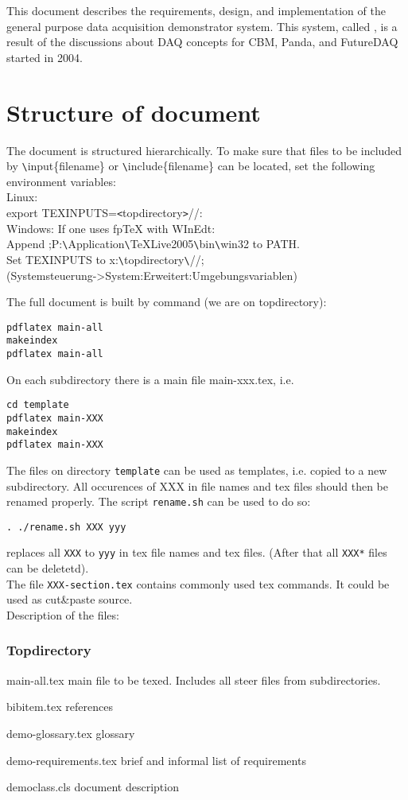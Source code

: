 
This document describes the requirements, design, and implementation of the
general purpose data acquisition demonstrator system.
This system, called {\DDA}, is a result of the discussions about DAQ concepts for CBM,
Panda, and FutureDAQ started in 2004.

\section{Structure of document}
The document is structured hierarchically. To make sure that files
to be included by \verb+\+input\{filename\} or \verb+\+include\{filename\}
can be located, set the following environment variables:\\
Linux:\\
export TEXINPUTS=\verb+<+topdirectory\verb+>+//:\\
Windows: If one uses fpTeX with WInEdt:\\
Append ;P:\verb+\+Application\verb+\+TeXLive2005\verb+\+bin\verb+\+win32 to PATH.\\
Set TEXINPUTS to x:\verb+\+topdirectory\verb+\+//;\\
(Systemsteuerung->System:Erweitert:Umgebungsvariablen)

The full document is built by command (we are on topdirectory):
\begin{verbatim}
pdflatex main-all
makeindex
pdflatex main-all
\end{verbatim}
On each subdirectory there is a main file main-xxx.tex, i.e.
\begin{verbatim}
cd template
pdflatex main-XXX
makeindex
pdflatex main-XXX
\end{verbatim}
The files on directory {\tt template} can be used as templates, i.e. copied to a new subdirectory.
All occurences of XXX in file names and tex files should then be renamed properly.
The script {\tt rename.sh} can be used to do so:
\begin{verbatim}
. ./rename.sh XXX yyy
\end{verbatim}
replaces all {\tt XXX} to {\tt yyy} in tex file names and tex files.
(After that all {\tt *XXX*} files can be deletetd).\\
The file {\tt XXX-section.tex} contains commonly used tex commands.
It could be used as cut\&paste source.\\
Description of the files:
\subsubsection{Topdirectory}
\begin{compactdesc}
\item[main-all.tex] main file to be texed. Includes all steer files from subdirectories.
\item[bibitem.tex] references
\item[demo-glossary.tex] glossary
\item[demo-requirements.tex] brief and informal list of requirements
\item[democlass.cls] document description
\end{compactdesc}
